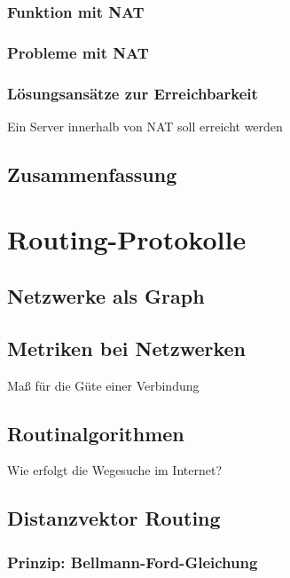 \subsubsection*{Funktion mit NAT}
\subsubsection{Probleme mit NAT}
\subsubsection{Lösungsansätze zur Erreichbarkeit}
Ein Server innerhalb von NAT soll erreicht werden
\subsection{Zusammenfassung}

\section{Routing-Protokolle}
\subsection{Netzwerke als Graph}

\subsection{Metriken bei Netzwerken}
Maß für die Güte einer Verbindung

\subsection{Routinalgorithmen}
Wie erfolgt die Wegesuche im Internet?

\subsection{Distanzvektor Routing}

\subsubsection{Prinzip: Bellmann-Ford-Gleichung}
